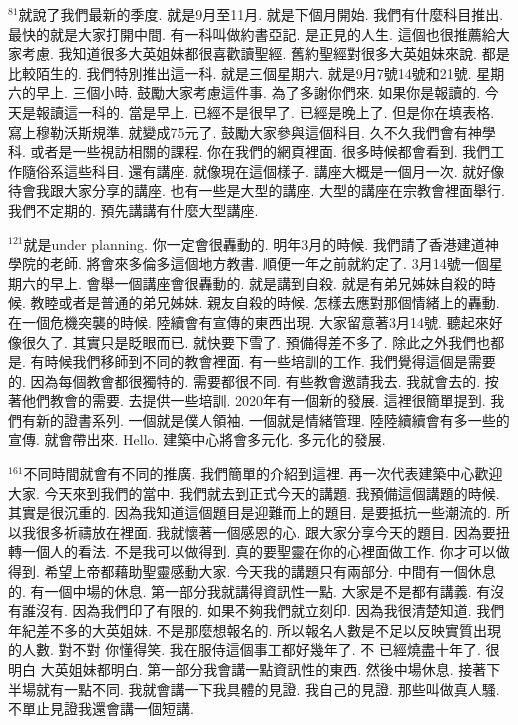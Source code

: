 \documentclass{book}
\begin{document}
$^{81}$就說了我們最新的季度.
就是9月至11月.
就是下個月開始.
我們有什麼科目推出.
最快的就是大家打開中間.
有一科叫做約書亞記.
是正見的人生.
這個也很推薦給大家考慮.
我知道很多大英姐妹都很喜歡讀聖經.
舊約聖經對很多大英姐妹來說.
都是比較陌生的.
我們特別推出這一科.
就是三個星期六.
就是9月7號14號和21號.
星期六的早上.
三個小時.
鼓勵大家考慮這件事.
為了多謝你們來.
如果你是報讀的.
今天是報讀這一科的.
當是早上.
已經不是很早了.
已經是晚上了.
但是你在填表格.
寫上穆勒沃斯規準.
就變成75元了.
鼓勵大家參與這個科目.
久不久我們會有神學科.
或者是一些視訪相關的課程.
你在我們的網頁裡面.
很多時候都會看到.
我們工作隨俗系這些科目.
還有講座.
就像現在這個樣子.
講座大概是一個月一次.
就好像待會我跟大家分享的講座.
也有一些是大型的講座.
大型的講座在宗教會裡面舉行.
我們不定期的.
預先講講有什麼大型講座.

$^{121}$就是under planning.
你一定會很轟動的.
明年3月的時候.
我們請了香港建道神學院的老師.
將會來多倫多這個地方教書.
順便一年之前就約定了.
3月14號一個星期六的早上.
會舉一個講座會很轟動的.
就是講到自殺.
就是有弟兄姊妹自殺的時候.
教睦或者是普通的弟兄姊妹.
親友自殺的時候.
怎樣去應對那個情緒上的轟動.
在一個危機突襲的時候.
陸續會有宣傳的東西出現.
大家留意著3月14號.
聽起來好像很久了.
其實只是眨眼而已.
就快要下雪了.
預備得差不多了.
除此之外我們也都是.
有時候我們移師到不同的教會裡面.
有一些培訓的工作.
我們覺得這個是需要的.
因為每個教會都很獨特的.
需要都很不同.
有些教會邀請我去.
我就會去的.
按著他們教會的需要.
去提供一些培訓.
2020年有一個新的發展.
這裡很簡單提到.
我們有新的證書系列.
一個就是僕人領袖.
一個就是情緒管理.
陸陸續續會有多一些的宣傳.
就會帶出來.
Hello.
建築中心將會多元化.
多元化的發展.

$^{161}$不同時間就會有不同的推廣.
我們簡單的介紹到這裡.
再一次代表建築中心歡迎大家.
今天來到我們的當中.
我們就去到正式今天的講題.
我預備這個講題的時候.
其實是很沉重的.
因為我知道這個題目是迎難而上的題目.
是要抵抗一些潮流的.
所以我很多祈禱放在裡面.
我就懷著一個感恩的心.
跟大家分享今天的題目.
因為要扭轉一個人的看法.
不是我可以做得到.
真的要聖靈在你的心裡面做工作.
你才可以做得到.
希望上帝都藉助聖靈感動大家.
今天我的講題只有兩部分.
中間有一個休息的.
有一個中場的休息.
第一部分我就講得資訊性一點.
大家是不是都有講義.
有沒有誰沒有.
因為我們印了有限的.
如果不夠我們就立刻印.
因為我很清楚知道.
我們年紀差不多的大英姐妹.
不是那麼想報名的.
所以報名人數是不足以反映實質出現的人數.
對不對 你懂得笑.
我在服侍這個事工都好幾年了.
不 已經燒盡十年了.
很明白 大英姐妹都明白.
第一部分我會講一點資訊性的東西.
然後中場休息.
接著下半場就有一點不同.
我就會講一下我具體的見證.
我自己的見證.
那些叫做真人騷.
不單止見證我還會講一個短講.
\end{document}
